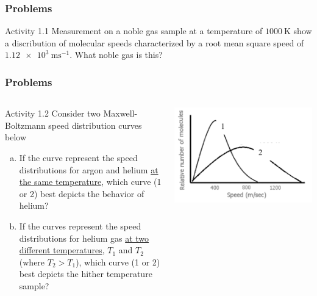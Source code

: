 \documentclass[aspectratio=169,xcolor={dvipsnames}]{beamer}
\begin{document}
\begin{frame}[t]
\begin{figure}
    \end{figure}
\end{frame}

\begin{frame}[t]
    \frametitle{Problems}
    \begin{block}{Activity 1.1}
        Measurement on a noble gas sample at a temperature of $\SI{1000}{\kelvin}$
        show a discribution of molecular speeds characterized by a root mean square
        speed of $\SI{1.12e3}{\metre\second^{-1}}$.
        What noble gas is this?
    \end{block}
\end{frame}

\begin{frame}[t]
    \frametitle{Problems}
    \begin{columns}
    \begin{column}{.65\textwidth}
    \begin{block}{Activity 1.2}
        Consider two Maxwell-Boltzmann speed distribution curves below
        \begin{enumerate}[a.]
            \item If the curve represent the speed distributions for argon and 
                helium \ul{at the same temperature}, which curve
                (1 or 2) best depicts the behavior of helium?
            \item If the curves represent the speed distributions for helium gas
                \ul{at two different temperatures}, $T_1$ and $T_2$
                (where $T_2>T_1$), which curve (1 or 2) best depicts the hither
                temperature sample? 
        \end{enumerate}
    \end{block}
    \end{column}
    \begin{column}{.35\textwidth}
        \includegraphics[width=\textwidth]{2b.png}
    \end{column}
    \end{columns}
\end{frame}
\end{document}
